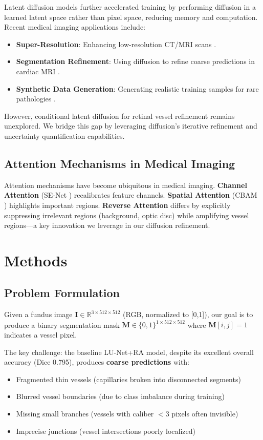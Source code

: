 \documentclass[11pt]{article}
\begin{document}
Latent diffusion models \cite{Rombach2022} further accelerated training by performing diffusion in a learned latent space rather than pixel space, reducing memory and computation. Recent medical imaging applications include:
\begin{itemize}
    \item \textbf{Super-Resolution}: Enhancing low-resolution CT/MRI scans \cite{Whang2023}.
    \item \textbf{Segmentation Refinement}: Using diffusion to refine coarse predictions in cardiac MRI \cite{Wolleb2023}.
    \item \textbf{Synthetic Data Generation}: Generating realistic training samples for rare pathologies \cite{Kazerouni2023}.
\end{itemize}

However, conditional latent diffusion for retinal vessel refinement remains unexplored. We bridge this gap by leveraging diffusion's iterative refinement and uncertainty quantification capabilities.

\subsection{Attention Mechanisms in Medical Imaging}

Attention mechanisms have become ubiquitous in medical imaging. \textbf{Channel Attention} (SE-Net \cite{Hu2018}) recalibrates feature channels. \textbf{Spatial Attention} (CBAM \cite{Woo2018}) highlights important regions. \textbf{Reverse Attention} \cite{LU2023} differs by explicitly suppressing irrelevant regions (background, optic disc) while amplifying vessel regions—a key innovation we leverage in our diffusion refinement.

\section{Methods}
\label{sec:methods}

\subsection{Problem Formulation}

Given a fundus image $\mathbf{I} \in \mathbb{R}^{3 \times 512 \times 512}$ (RGB, normalized to [0,1]), our goal is to produce a binary segmentation mask $\mathbf{M} \in \{0,1\}^{1 \times 512 \times 512}$ where $\mathbf{M}[i,j]=1$ indicates a vessel pixel.

The key challenge: the baseline LU-Net+RA model, despite its excellent overall accuracy (Dice 0.795), produces \textbf{coarse predictions} with:
\begin{itemize}
    \item Fragmented thin vessels (capillaries broken into disconnected segments)
    \item Blurred vessel boundaries (due to class imbalance during training)
    \item Missing small branches (vessels with caliber $< 3$ pixels often invisible)
    \item Imprecise junctions (vessel intersections poorly localized)
\end{itemize}
\end{document}
